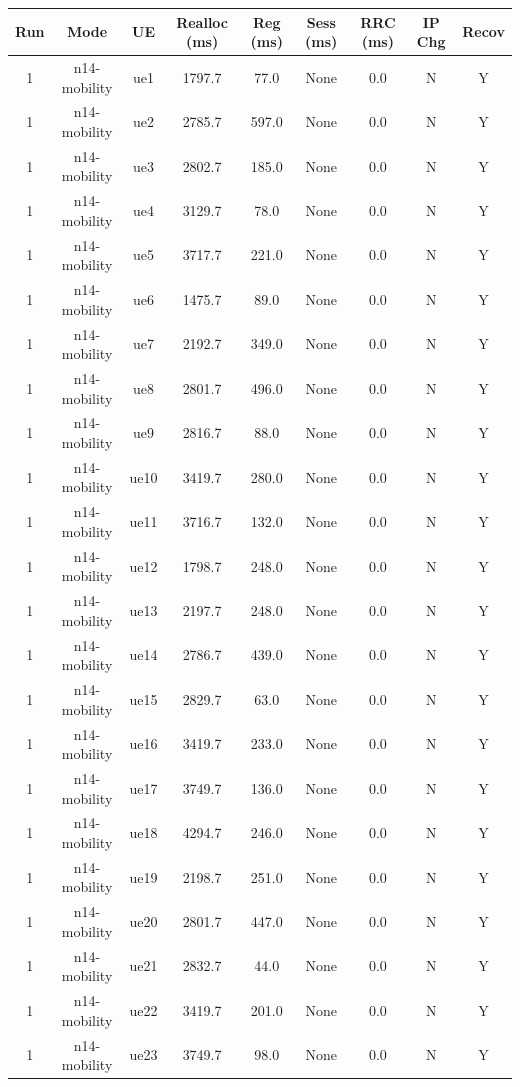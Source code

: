 \begin{table}[ht]
\centering
\begin{tabular}{|c|c|c|c|c|c|c|c|c|}
\hline
Run & Mode & UE & Realloc (ms) & Reg (ms) & Sess (ms) & RRC (ms) & IP Chg & Recov \\
\hline
1 & n14-mobility & ue1 & 1797.7 & 77.0 & None & 0.0 & N & Y \\
1 & n14-mobility & ue2 & 2785.7 & 597.0 & None & 0.0 & N & Y \\
1 & n14-mobility & ue3 & 2802.7 & 185.0 & None & 0.0 & N & Y \\
1 & n14-mobility & ue4 & 3129.7 & 78.0 & None & 0.0 & N & Y \\
1 & n14-mobility & ue5 & 3717.7 & 221.0 & None & 0.0 & N & Y \\
1 & n14-mobility & ue6 & 1475.7 & 89.0 & None & 0.0 & N & Y \\
1 & n14-mobility & ue7 & 2192.7 & 349.0 & None & 0.0 & N & Y \\
1 & n14-mobility & ue8 & 2801.7 & 496.0 & None & 0.0 & N & Y \\
1 & n14-mobility & ue9 & 2816.7 & 88.0 & None & 0.0 & N & Y \\
1 & n14-mobility & ue10 & 3419.7 & 280.0 & None & 0.0 & N & Y \\
1 & n14-mobility & ue11 & 3716.7 & 132.0 & None & 0.0 & N & Y \\
1 & n14-mobility & ue12 & 1798.7 & 248.0 & None & 0.0 & N & Y \\
1 & n14-mobility & ue13 & 2197.7 & 248.0 & None & 0.0 & N & Y \\
1 & n14-mobility & ue14 & 2786.7 & 439.0 & None & 0.0 & N & Y \\
1 & n14-mobility & ue15 & 2829.7 & 63.0 & None & 0.0 & N & Y \\
1 & n14-mobility & ue16 & 3419.7 & 233.0 & None & 0.0 & N & Y \\
1 & n14-mobility & ue17 & 3749.7 & 136.0 & None & 0.0 & N & Y \\
1 & n14-mobility & ue18 & 4294.7 & 246.0 & None & 0.0 & N & Y \\
1 & n14-mobility & ue19 & 2198.7 & 251.0 & None & 0.0 & N & Y \\
1 & n14-mobility & ue20 & 2801.7 & 447.0 & None & 0.0 & N & Y \\
1 & n14-mobility & ue21 & 2832.7 & 44.0 & None & 0.0 & N & Y \\
1 & n14-mobility & ue22 & 3419.7 & 201.0 & None & 0.0 & N & Y \\
1 & n14-mobility & ue23 & 3749.7 & 98.0 & None & 0.0 & N & Y \\

\end{tabular}
\end{table}
